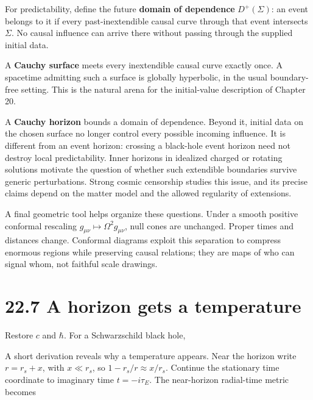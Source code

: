 \documentclass[
  11pt,
  letterpaper,
  oneside,
  openany]{scrbook}
\begin{document}
For predictability, define the future \textbf{domain of dependence}
\(D^+(\Sigma)\): an event belongs to it if every past-inextendible
causal curve through that event intersects \(\Sigma\). No causal
influence can arrive there without passing through the supplied initial
data.

A \textbf{Cauchy surface} meets every inextendible causal curve exactly
once. A spacetime admitting such a surface is globally hyperbolic, in
the usual boundary-free setting. This is the natural arena for the
initial-value description of Chapter 20.

A \textbf{Cauchy horizon} bounds a domain of dependence. Beyond it,
initial data on the chosen surface no longer control every possible
incoming influence. It is different from an event horizon: crossing a
black-hole event horizon need not destroy local predictability. Inner
horizons in idealized charged or rotating solutions motivate the
question of whether such extendible boundaries survive generic
perturbations. Strong cosmic censorship studies this issue, and its
precise claims depend on the matter model and the allowed regularity of
extensions.

A final geometric tool helps organize these questions. Under a smooth
positive conformal rescaling \(g_{\mu\nu}\mapsto\Omega^2g_{\mu\nu}\),
null cones are unchanged. Proper times and distances change. Conformal
diagrams exploit this separation to compress enormous regions while
preserving causal relations; they are maps of who can signal whom, not
faithful scale drawings.

\hypertarget{a-horizon-gets-a-temperature}{%
\section{22.7 A horizon gets a
temperature}\label{a-horizon-gets-a-temperature}}

Restore \(c\) and \(\hbar\). For a Schwarzschild black hole,

\begin{center}
\begingroup
{}
\ifdim\wd\grmathbox>\linewidth
\resizebox{\linewidth}{!}{\usebox{\grmathbox}}
\else\usebox{\grmathbox}\fi
\endgroup
\end{center}

A short derivation reveals why a temperature appears. Near the horizon
write \(r=r_s+x\), with \(x\ll r_s\), so \(1-r_s/r\approx x/r_s\).
Continue the stationary time coordinate to imaginary time
\(t=-i\tau_E\). The near-horizon radial-time metric becomes
\end{document}

